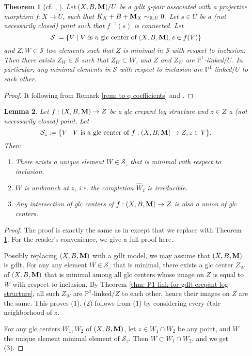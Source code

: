 \documentclass[11pt]{amsart}
\numberwithin{equation}{section}
\newcommand{\Mm}{{\bf{M}}}
\newtheorem{thm}{Theorem}[section]
\newtheorem{lem}[thm]{Lemma}
\theoremstyle{definition}
\theoremstyle{definition}
\theoremstyle{definition}
\begin{document}
\begin{thm}[cf. {\cite[Theorem 3.5]{Bir20}, \cite[Theorem
  1.4]{FS20}}]\label{thm: P1 link for gdlt crepant log structure}
  Let $(X,B,\Mm)/U$ be a gdlt g-pair associated with a projective
  morphism $f: X\rightarrow U$, such that $K_X+B+\Mm_X\sim_{\mathbb
  R,U}0$. Let $s\in U$ be a (not necessarily closed) point such that
  $f^{-1}(s)$ is connected. Let
  $$\mathcal{S}:=\{V\mid V\text{ is a glc center of }(X,B,\Mm), s\in f(V)\}$$
  and $Z,W\in\mathcal{S}$ two elements such that $Z$ is minimal in
  $\mathcal{S}$ with respect to inclusion. Then there exists
  $Z_W\in\mathcal{S}$ such that $Z_W\subset W$, and $Z$ and $Z_W$ are
  $\mathbb P^1$-linked$/U$. In particular, any minimal elements in
  $\mathcal{S}$ with respect to inclusion are $\mathbb
  P^1$-linked$/U$ to each other.
\end{thm}
\begin{proof}
  It following from Remark \ref{rem: to q coefficients} and
  \cite[Theorem 1.4]{FS20}.
\end{proof}

\begin{lem}\label{lem: glc locus is unibranch}
  Let $f: (X,B,\Mm)\rightarrow Z$ be a glc crepant log structure and
  $z\in Z$ a (not necessarily closed) point. Let
  $$\mathcal{S}_z:=\{V\mid V\text{ is a glc center of }f:
  (X,B,\Mm)\rightarrow Z, z\in V\}.$$
  Then:
  \begin{enumerate}
    \item There exists a unique element $W\in\mathcal{S}_z$ that is
      minimal with respect to inclusion.
    \item $W$ is unibranch at $z$, i.e.  the completion $\hat{W}_z$
      is irreducible.
    \item Any intersection of glc centers of $f: (X,B,\Mm)\rightarrow
      Z$  is also a union of glc centers.
  \end{enumerate}
\end{lem}
\begin{proof}
  The proof is exactly the same as in \cite[Proof of Corollary
  4.41]{Kol13} except that we replace \cite[Theorem 4.40]{Kol13} with
  Theorem \ref{thm: P1 link for gdlt crepant log structure}. For the
  reader's convenience, we give a full proof here.

  Possibly replacing $(X,B,\Mm)$ with a gdlt model, we may assume
  that $(X,B,\Mm)$ is gdlt. For any any element $W\in\mathcal{S}_z$
  that is minimal, there exists a glc center $Z_W$ of $(X,B,\Mm)$
  that is minimal among all glc centers whose image on $Z$ is equal
  to $W$ with respect to inclusion. By Theorem \ref{thm: P1 link for
  gdlt crepant log structure}, all such $Z_W$ are $\mathbb
  P^1$-linked$/Z$ to each other, hence their images on $Z$ are the
  same. This proves (1). (2) follows from (1) by considering every
  \'etale neighborhood of $z$.

  For any glc centers $W_1,W_2$ of $(X,B,\Mm)$, let $z\in W_1\cap
  W_2$ be any point, and $W$ the unique element minimal element of
  $\mathcal{S}_z$. Then $W\subset W_1\cap W_2$, and we get (3).
\end{proof}
\end{document}
